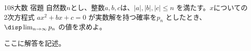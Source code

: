 \begin{thm}{108}{}{大数 宿題}
 自然数$n$とし、整数$a, b, c$は、$|a|, |b|, |c| \le n$ を満たす。$x$についての2次方程式 $ax^2+bx+c=0$ が実数解を持つ確率を$p_n$ としたとき、$\disp \lim_{n\to\infty} p_n$ の値を求めよ。
\end{thm}

ここに解答を記述。